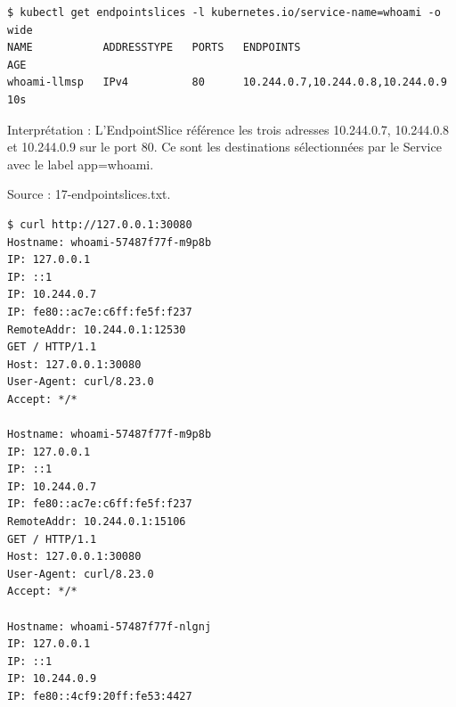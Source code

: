 \documentclass[11pt,a4paper]{article}
\begin{document}
\par\medskip\noindent\begin{minipage}{\linewidth}
\par\vspace{4pt}\noindent\begin{minipage}{\linewidth}
\begin{Verbatim}[breaklines=true,breakanywhere=true,fontsize=\footnotesize,frame=single,framesep=8pt,rulecolor=\color{teal}]
$ kubectl get endpointslices -l kubernetes.io/service-name=whoami -o wide
NAME           ADDRESSTYPE   PORTS   ENDPOINTS                          AGE
whoami-llmsp   IPv4          80      10.244.0.7,10.244.0.8,10.244.0.9   10s
\end{Verbatim}
\end{minipage}\par\vspace{6pt}

Interprétation : L'EndpointSlice référence les trois adresses 10.244.0.7, 10.244.0.8 et 10.244.0.9 sur le port 80. Ce sont les destinations sélectionnées par le Service avec le label app=whoami.

{\footnotesize\color{teal} Source : 17-endpointslices.txt.\par}
\end{minipage}\par\medskip

\par\medskip\noindent\begin{minipage}{\linewidth}
\par\vspace{4pt}\noindent\begin{minipage}{\linewidth}
\begin{Verbatim}[breaklines=true,breakanywhere=true,fontsize=\footnotesize,frame=single,framesep=8pt,rulecolor=\color{teal}]
$ curl http://127.0.0.1:30080
Hostname: whoami-57487f77f-m9p8b
IP: 127.0.0.1
IP: ::1
IP: 10.244.0.7
IP: fe80::ac7e:c6ff:fe5f:f237
RemoteAddr: 10.244.0.1:12530
GET / HTTP/1.1
Host: 127.0.0.1:30080
User-Agent: curl/8.23.0
Accept: */*

Hostname: whoami-57487f77f-m9p8b
IP: 127.0.0.1
IP: ::1
IP: 10.244.0.7
IP: fe80::ac7e:c6ff:fe5f:f237
RemoteAddr: 10.244.0.1:15106
GET / HTTP/1.1
Host: 127.0.0.1:30080
User-Agent: curl/8.23.0
Accept: */*

Hostname: whoami-57487f77f-nlgnj
IP: 127.0.0.1
IP: ::1
IP: 10.244.0.9
IP: fe80::4cf9:20ff:fe53:4427
\end{Verbatim}
\end{minipage}\par\vspace{6pt}

\end{minipage}\par\medskip
\end{document}
